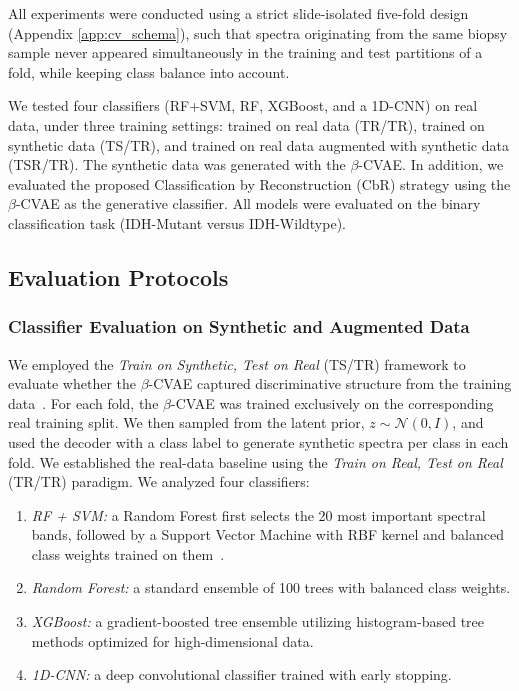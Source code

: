 \documentclass[12pt]{article}
\theoremstyle{paper}
\begin{document}
All experiments were conducted using a strict slide-isolated five-fold design (Appendix \ref{app:cv_schema}), such that spectra originating from the same biopsy sample never appeared simultaneously in the training and test partitions of a fold, while keeping class balance into account. 

We tested four classifiers (RF+SVM, RF, XGBoost, and a 1D-CNN) on real data, under three training settings: trained on real data (TR/TR), trained on synthetic data (TS/TR), and trained on real data augmented with synthetic data (TSR/TR). The synthetic data was generated with the $\beta$-CVAE. In addition, we evaluated the proposed Classification by Reconstruction (CbR) strategy using the $\beta$-CVAE as the generative classifier. All models were evaluated on the binary classification task (IDH-Mutant versus IDH-Wildtype).

\subsection{Evaluation Protocols}

\subsubsection{Classifier Evaluation on Synthetic and Augmented Data}
We employed the \emph{Train on Synthetic, Test on Real} (TS/TR) framework to evaluate whether the $\beta$-CVAE captured discriminative structure from the training data~\cite{esteban2017real}. For each fold, the $\beta$-CVAE was trained exclusively on the corresponding real training split. We then sampled from the latent prior, $z \sim \mathcal{N}(0, I)$, and used the decoder with a class label to generate synthetic spectra per class in each fold. We established the real-data baseline using the \emph{Train on Real, Test on Real} (TR/TR) paradigm. We analyzed four classifiers:
\begin{enumerate}
    \item \emph{RF + SVM:} a Random Forest first selects the 20 most important spectral bands, followed by a Support Vector Machine with RBF kernel and balanced class weights trained on them~\cite{apollonov2024raman}.
    
    \item \emph{Random Forest:} a standard ensemble of 100 trees with balanced class weights.
    
    \item \emph{XGBoost:} a gradient-boosted tree ensemble utilizing histogram-based tree methods optimized for high-dimensional data.
    
    \item \emph{1D-CNN:} a deep convolutional classifier trained with early stopping.
\end{enumerate}
\end{document}
